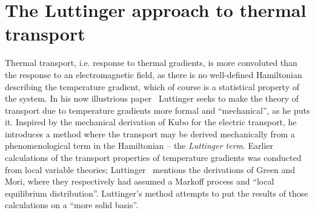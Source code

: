 
\section{The Luttinger approach to thermal transport}
Thermal transport, i.e. response to thermal gradients, is more convoluted than the response to an electromagnetic field, as there is no well-defined Hamiltonian describing the temperature gradient, which of course is a statistical property of the system.
In his now illustrious paper~\cite{luttingerTheoryThermalTransport1964} Luttinger seeks to make the theory of transport due to temperature gradients more formal and ``mechanical'', as he puts it.
Inspired by the mechanical derivation of Kubo for the electric transport, he introduces a method where the transport may be derived mechanically from a phenomenological term in the Hamiltonian -- the \emph{Luttinger term}.
Earlier calculations of the transport properties of temperature gradients was conducted from local variable theories;
Luttinger~\cite{luttingerTheoryThermalTransport1964} mentions the derivations of Green and Mori, where they respectively had assumed a Markoff process and ``local equilibrium distribution''.
Luttinger's method attempts to put the results of those calculations on a ``more solid basis''.

